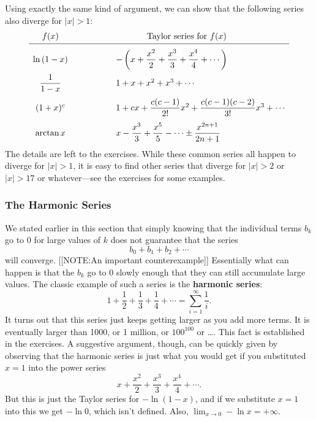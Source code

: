 Using exactly the same kind of argument, we can show that the
following series also diverge for $|x|>1$:
\[
\begin{array}{ccl}
f(x) &\hspace{.5in} & \hspace{.5in}\mbox{Taylor series for $f(x)$} \\ [2pt] 
\hline & & \\ [-6pt] 
\ln{(1-x)}& & - \left(x + \dfrac{x^2}{2} + \dfrac{x^3}{3} 
                + \dfrac{x^4}{4} + \cdots \right)\\ [.15in]
\dfrac{1}{1-x}& & 1 + x + x^2 + x^3 + \cdots  \\ [.15in]
(1+x)^c & & 1 + cx + \dfrac{c(c-1)}{2!}x^2 
              + \dfrac{c(c-1)(c-2)}{3!}x^3 + \cdots  \\ [.15in]
\arctan{x} & & x - \dfrac{x^3}{3} + \dfrac{x^5}{5} - \cdots
                  \pm  \dfrac{x^{2n+1}}{2n+1}
\end{array}
\]
The details are left to the exercises.  While these common series all
happen to diverge for $|x|>1$, it is easy to find other series that
diverge for $|x|>2$ or $|x|>17$ or whatever---see the exercises for
some examples.

\subsubsection{The Harmonic Series}
\label{subsubsec:the-harmonic-series}

We stated earlier in this section that simply knowing that the
individual terms $b_k$ go to 0 for large values of $k$ does not
guarantee that the series
\[
b_0 + b_1 + b_2 + \cdots
\]
will converge.  
[[NOTE:An important counterexample]]
Essentially what can happen is that the $b_k$ go to 0 slowly enough
that they can still accumulate large values.  The classic example of
such a series is the {\bf harmonic series}:
\[
1 + \dfrac{1}{2} + \dfrac{1}{3} + \dfrac{1}{4} + \cdots 
    = \sum_{i=1}^\infty \dfrac{1}{i}.
\]
It turns out that this series just keeps getting larger as you add
more terms. It is eventually larger than 1000, or 1 million, or
$100^{100}$ or \ldots.  This fact is established in the exercises.  A
suggestive argument, though, can be quickly given by observing that
the harmonic series is just what you would get if you substituted
$x=1$ into the power series
\[
x + \dfrac{x^2}{2} + \dfrac{x^3}{3} + \dfrac{x^4}{4} + \cdots .
\]
But this is just the Taylor series for $-\ln(1-x)$, and if we
substitute $x=1$ into this we get $-\ln{0}$, which isn't defined.
Also, $\lim_{x \to 0} -\ln{x}=+\infty$.

